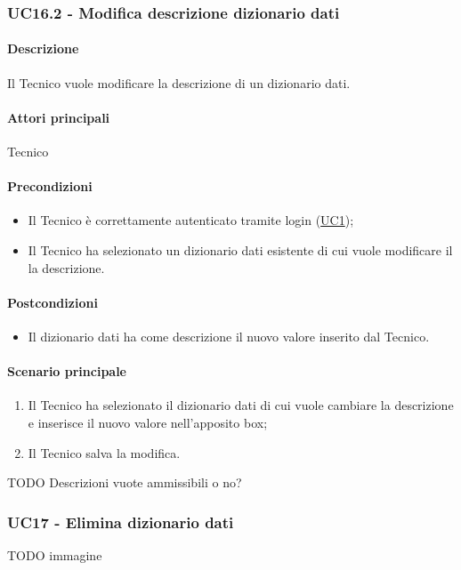 \subsubsection{UC16.2 - Modifica descrizione dizionario dati}\label{UC16point2}
\paragraph*{Descrizione} Il Tecnico vuole modificare la descrizione di un dizionario dati.
\paragraph*{Attori principali} Tecnico
\paragraph*{Precondizioni}
\begin{itemize}
  \item Il Tecnico è correttamente autenticato tramite login (\hyperref[UC1]{UC1});
  \item Il Tecnico ha selezionato un dizionario dati esistente di cui vuole modificare il la descrizione.  
\end{itemize}
\paragraph*{Postcondizioni}
\begin{itemize}
  \item Il dizionario dati ha come descrizione il nuovo valore inserito dal Tecnico.
\end{itemize}
\paragraph*{Scenario principale}
\begin{enumerate}
  \item Il Tecnico ha selezionato il dizionario dati di cui vuole cambiare la descrizione e inserisce il nuovo valore nell’apposito box;
  \item Il Tecnico salva la modifica.
\end{enumerate}

TODO Descrizioni vuote ammissibili o no?


\subsubsection{UC17 - Elimina dizionario dati}\label{UC17}
TODO immagine
